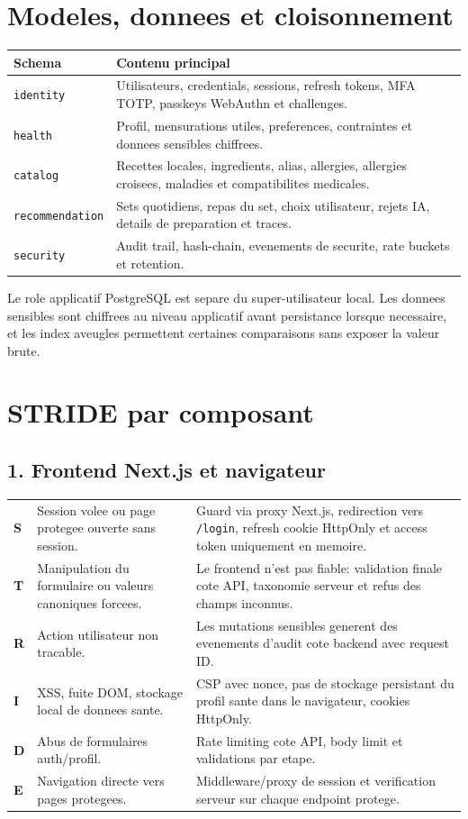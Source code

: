 \documentclass[10pt,a4paper]{article}
\begin{document}
\section{Modeles, donnees et cloisonnement}
\begin{tabularx}{\textwidth}{@{}L{3.2cm}Y@{}}
\toprule
\textbf{Schema} & \textbf{Contenu principal} \\
\midrule
\texttt{identity} & Utilisateurs, credentials, sessions, refresh tokens, MFA TOTP, passkeys WebAuthn et challenges. \\
\texttt{health} & Profil, mensurations utiles, preferences, contraintes et donnees sensibles chiffrees. \\
\texttt{catalog} & Recettes locales, ingredients, alias, allergies, allergies croisees, maladies et compatibilites medicales. \\
\texttt{recommendation} & Sets quotidiens, repas du set, choix utilisateur, rejets IA, details de preparation et traces. \\
\texttt{security} & Audit trail, hash-chain, evenements de securite, rate buckets et retention. \\
\bottomrule
\end{tabularx}

Le role applicatif PostgreSQL est separe du super-utilisateur local. Les donnees sensibles sont chiffrees au niveau applicatif avant persistance lorsque necessaire, et les index aveugles permettent certaines comparaisons sans exposer la valeur brute.

\newpage
\section{STRIDE par composant}
\subsection{1. Frontend Next.js et navigateur}
\begin{tabularx}{\textwidth}{@{}L{1.6cm}L{4.2cm}Y@{}}
\toprule
\textbf{S} & Session volee ou page protegee ouverte sans session. & Guard via proxy Next.js, redirection vers \texttt{/login}, refresh cookie HttpOnly et access token uniquement en memoire. \\
\textbf{T} & Manipulation du formulaire ou valeurs canoniques forcees. & Le frontend n'est pas fiable: validation finale cote API, taxonomie serveur et refus des champs inconnus. \\
\textbf{R} & Action utilisateur non tracable. & Les mutations sensibles generent des evenements d'audit cote backend avec request ID. \\
\textbf{I} & XSS, fuite DOM, stockage local de donnees sante. & CSP avec nonce, pas de stockage persistant du profil sante dans le navigateur, cookies HttpOnly. \\
\textbf{D} & Abus de formulaires auth/profil. & Rate limiting cote API, body limit et validations par etape. \\
\textbf{E} & Navigation directe vers pages protegees. & Middleware/proxy de session et verification serveur sur chaque endpoint protege. \\
\bottomrule
\end{tabularx}
\end{document}
